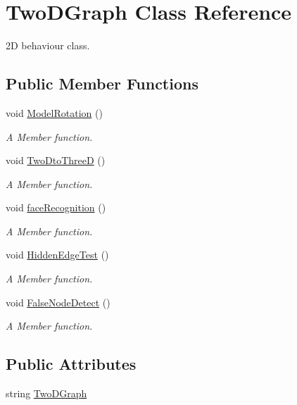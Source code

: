 \hypertarget{classTwoDGraph}{}\section{Two\+D\+Graph Class Reference}
\label{classTwoDGraph}


2D behaviour class.  


\subsection*{Public Member Functions}
\begin{DoxyCompactItemize}
\item 
void \hyperlink{classTwoDGraph_a1eb77cb9e303bdcd28f985a1f3ca02b4}{Model\+Rotation} ()
\begin{DoxyCompactList}\small\item\em A Member function. \end{DoxyCompactList}\item 
void \hyperlink{classTwoDGraph_a54093bf95a87106de242cc8b8050243e}{Two\+Dto\+ThreeD} ()
\begin{DoxyCompactList}\small\item\em A Member function. \end{DoxyCompactList}\item 
void \hyperlink{classTwoDGraph_a7606c71011057d955db34a43e672ffd9}{face\+Recognition} ()
\begin{DoxyCompactList}\small\item\em A Member function. \end{DoxyCompactList}\item 
void \hyperlink{classTwoDGraph_af25742b8b2903fe231a7ccbbfbb48e08}{Hidden\+Edge\+Test} ()
\begin{DoxyCompactList}\small\item\em A Member function. \end{DoxyCompactList}\item 
void \hyperlink{classTwoDGraph_a48b9e1804733df394bd2bc2c78fec6aa}{False\+Node\+Detect} ()
\begin{DoxyCompactList}\small\item\em A Member function. \end{DoxyCompactList}\end{DoxyCompactItemize}
\subsection*{Public Attributes}
\begin{DoxyCompactItemize}
\item 
string \hyperlink{classTwoDGraph_a786f5077be86666958f4037e131704be}{Two\+D\+Graph}
\end{DoxyCompactItemize}


